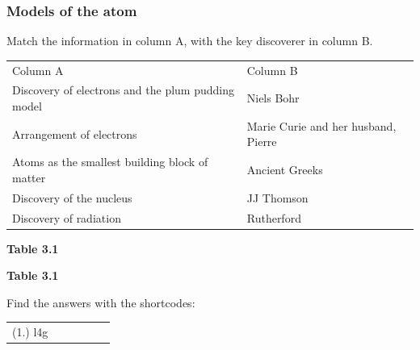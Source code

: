             \subsubsection{ Models of the atom}
            \nopagebreak
            \label{m38756*eip-786}Match the information in column A, with the key discoverer in column B.
          \begin{table}[H]
        \begin{center}
      \label{m38756*eip-551}
    \noindent
      \tablelasttail{}
      \begin{xtabular}[t]{|l|l|}\hline
        Column A &
        Column B%
     \tabularnewline{}
        Discovery of electrons and the plum pudding model &
        Niels Bohr%
     \tabularnewline{}
        Arrangement of electrons &
        Marie Curie and her husband, Pierre%
     \tabularnewline{}
        Atoms as the smallest building block of matter &
        Ancient Greeks%
     \tabularnewline{}
        Discovery of the nucleus &
        JJ Thomson%
     \tabularnewline{}
        Discovery of radiation &
        Rutherford%
     \tabularnewline{}
    \end{xtabular}
      \end{center}
    \begin{center}{\small\bfseries Table 3.1}\end{center}
    \begin{caption}{\small\bfseries Table 3.1}\end{caption}
\end{table}
    \par
        \par 
    \label{m38756*cid3}
\par {} Find the answers with the shortcodes:
 \par \begin{tabular}[h]{cccccc}
 (1.) l4g  & \end{tabular}
